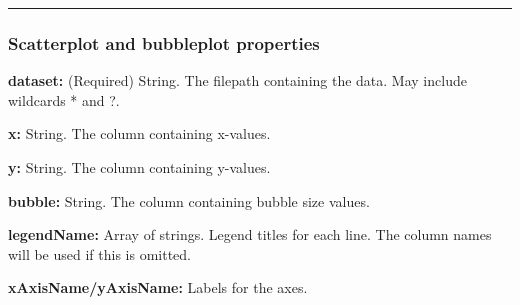 \begin{Shaded}
\begin{Highlighting}[]
\AttributeTok{    }\KeywordTok{{-}}\AttributeTok{ }\KeywordTok{:}\AttributeTok{ }
\AttributeTok{      }\KeywordTok{:}\AttributeTok{ }
\AttributeTok{      }\KeywordTok{:}\AttributeTok{ }
\AttributeTok{      }\KeywordTok{:}\AttributeTok{ }
\AttributeTok{      }\KeywordTok{:}\AttributeTok{ }
\AttributeTok{      }\KeywordTok{:}\AttributeTok{ }
\AttributeTok{      }\KeywordTok{:}\AttributeTok{ }
\AttributeTok{      }\KeywordTok{:}\AttributeTok{ }
\AttributeTok{      }\KeywordTok{:}\AttributeTok{ }
\AttributeTok{      }\KeywordTok{:}\AttributeTok{ }\KeywordTok{[}\KeywordTok{]}
\AttributeTok{      }\KeywordTok{:}\AttributeTok{ }
\AttributeTok{      }\KeywordTok{:}\AttributeTok{ }
\AttributeTok{      }\KeywordTok{:}\AttributeTok{ }
\AttributeTok{      }\KeywordTok{:}\AttributeTok{ }
\end{Highlighting}
\end{Shaded}

\begin{center}\rule{0.5\linewidth}{0.5pt}\end{center}

\hypertarget{scatterplot-and-bubbleplot-properties}{%
\subsubsection{Scatterplot and bubbleplot
properties}\label{scatterplot-and-bubbleplot-properties}}

\textbf{dataset:} (Required) String. The filepath containing the data.
May include wildcards * and ?.

\textbf{x:} String. The column containing x-values.

\textbf{y:} String. The column containing y-values.

\textbf{bubble:} String. The column containing bubble size values.

\textbf{legendName:} Array of strings. Legend titles for each line. The
column names will be used if this is omitted.

\textbf{xAxisName/yAxisName:} Labels for the axes.
